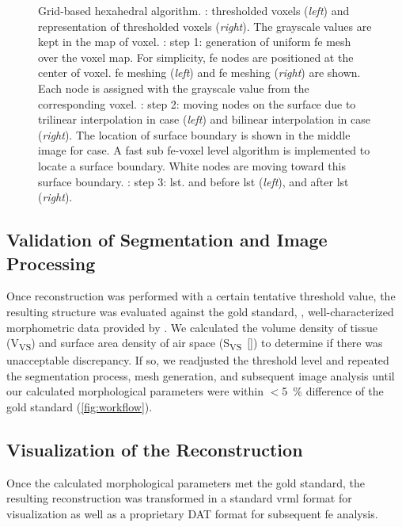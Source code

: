 \begin{figure}
{{			\label{subfig:tsuda-04d}%
		}%
	}%
	\caption[Grid-based hexahedral algorithm]{Grid-based hexahedral algorithm. : \threed thresholded voxels (\emph{left}) and \twod representation of thresholded voxels (\emph{right}). The grayscale values are kept in the map of voxel. : step 1: generation of uniform \acl{fe} mesh over the voxel map. For simplicity, \ac{fe} nodes are positioned at the center of voxel. \threed \ac{fe} meshing (\emph{left}) and \twod \ac{fe} meshing (\emph{right}) are shown. Each node is assigned with the grayscale value from the corresponding voxel. : step 2: moving nodes on the surface due to trilinear interpolation in \threed case (\emph{left}) and bilinear interpolation in \twod case (\emph{right}). The location of surface boundary is shown in the middle image for \twod case. A fast sub \ac{fe}-voxel level algorithm is implemented to locate a surface boundary. White nodes are moving toward this surface boundary. : step 3: \acf{lst}. \threed and \twod before \ac{lst} (\emph{left}), \threed and \twod after \ac{lst} (\emph{right}).}
	\label{fig:tsuda-04}
\end{figure}

\subsection[Validation of Segmentation]{Validation of Segmentation and Image Processing}
Once \threed reconstruction was performed with a certain tentative threshold value, the resulting \threed structure was evaluated against the gold standard, \ie, well-characterized morphometric data provided by \citet{Tschanz2003}. We calculated the volume density of tissue (V\textsubscript{VS}) and surface area density of air space (S\textsubscript{VS}~[\centimetresquared\per\centimetrecubed]) to determine if there was unacceptable discrepancy. If so, we readjusted the threshold level and repeated the segmentation process, mesh generation, and subsequent image analysis until our calculated morphological parameters were within $<$\SI{5}{\percent} difference of the gold standard (\autoref{fig:workflow}).

\subsection[Visualization of the Reconstruction]{Visualization of the \threed Reconstruction}
Once the calculated morphological parameters met the gold standard, the resulting \threed reconstruction was transformed in a standard \acs{vrml} format for visualization as well as a proprietary DAT format for subsequent \ac{fe} analysis.

